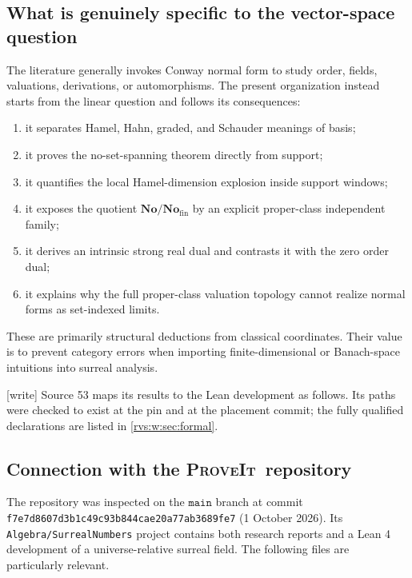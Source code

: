 \documentclass[11pt,letterpaper]{article}
\numberwithin{equation}{section}
\theoremstyle{definition}
\theoremstyle{remark}
\newcommand{\No}{\mathbf{No}}
\newcommand{\Fin}{\No_{\mathrm{fin}}}
\newcommand{\repo}{\textsc{ProveIt}}
\newcommand{\pathcode}[1]{\nolinkurl{#1}}
\newcommand{\wtag}{\textup{[write]}}%
\begin{document}
\subsection{What is genuinely specific to the vector-space question}

The literature generally invokes Conway normal form to study order, fields,
valuations, derivations, or automorphisms.  The present organization instead
starts from the linear question and follows its consequences:
\begin{enumerate}
\item it separates Hamel, Hahn, graded, and Schauder meanings of basis;
\item it proves the no-set-spanning theorem directly from support;
\item it quantifies the local Hamel-dimension explosion inside support
windows;
\item it exposes the quotient \(\No/\Fin\) by an explicit proper-class
independent family;
\item it derives an intrinsic strong real dual and contrasts it with the zero
order dual;
\item it explains why the full proper-class valuation topology cannot realize
normal forms as set-indexed limits.
\end{enumerate}
These are primarily structural deductions from classical coordinates.  Their
value is to prevent category errors when importing finite-dimensional or
Banach-space intuitions into surreal analysis.

\noindent\wtag{} Source 53 maps its results to the Lean development as
follows.  Its paths were checked to exist at the pin and at the placement
commit; the fully qualified declarations are listed in
\cref{rvs:w:sec:formal}.

\subsection{Connection with the \repo\ repository}\label{rvs:cv:sec:proveit}

The repository was inspected on the $\texttt{main}$ branch at commit
\pathcode{f7e7d8607d3b1c49c93b844cae20a77ab3689fe7} (1 October 2026). Its
\pathcode{Algebra/SurrealNumbers} project contains both research reports and a
Lean 4 development of a universe-relative surreal field. The following files are
particularly relevant.
\end{document}
